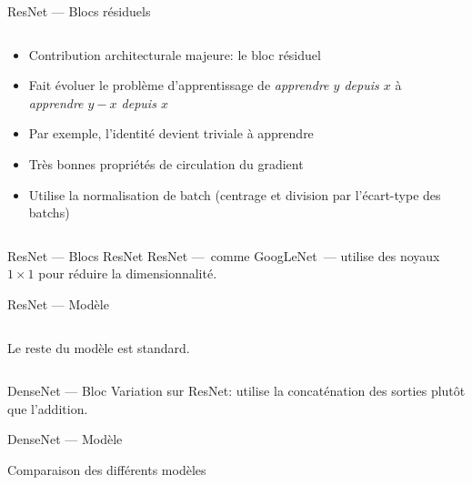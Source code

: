 \begin{frame}{ResNet --- Blocs résiduels}
  \begin{columns}
    \begin{column}{0.5\textwidth}
      \begin{itemize}[<+->]
        \item Contribution architecturale majeure: le bloc résiduel
        \item Fait évoluer le problème d'apprentissage de \emph{apprendre $y$ depuis $x$} à \emph{apprendre $y - x$ depuis $x$}
        \item Par exemple, l'identité devient triviale à apprendre
        \item Très bonnes propriétés de circulation du gradient
        \item Utilise la normalisation de batch (centrage et division par l'écart-type des batchs)
      \end{itemize}
    \end{column}
    \begin{column}{0.5\textwidth}
    \end{column}
  \end{columns}
\end{frame}

\begin{frame}{ResNet --- Blocs ResNet}
  ResNet ---~comme GoogLeNet~--- utilise des noyaux $1 \times 1$ pour réduire la dimensionnalité.

\end{frame}

\begin{frame}{ResNet --- Modèle}
  \begin{columns}
    \begin{column}{0.5\textwidth}
      Le reste du modèle est standard.
    \end{column}
    \begin{column}{0.5\textwidth}
    \end{column}
  \end{columns}
\end{frame}

\begin{frame}{DenseNet --- Bloc}
  Variation sur ResNet: utilise la concaténation des sorties plutôt que l'addition.

\end{frame}

\begin{frame}{DenseNet --- Modèle}
\end{frame}

\begin{frame}{Comparaison des différents modèles}
\end{frame}
